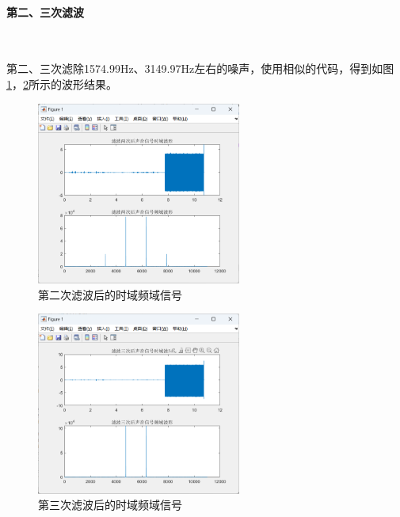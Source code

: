 \documentclass[UTF8]{ctexart}
\begin{document}
\paragraph{第二、三次滤波}~{}\par
第二、三次滤除1574.99Hz、3149.97Hz左右的噪声，使用相似的代码，得到如图\ref{img:3}，\ref{img:4}所示的波形结果。
\begin{figure}[htbp]
    \centering
    \includegraphics[width=0.6\textwidth]{3.png}
    \caption{第二次滤波后的时域频域信号}
    \label{img:3}
\end{figure}
\begin{figure}[htbp]
    \centering
    \includegraphics[width=0.6\textwidth]{4.png}
    \caption{第三次滤波后的时域频域信号}
    \label{img:4}
\end{figure}
\end{document}
